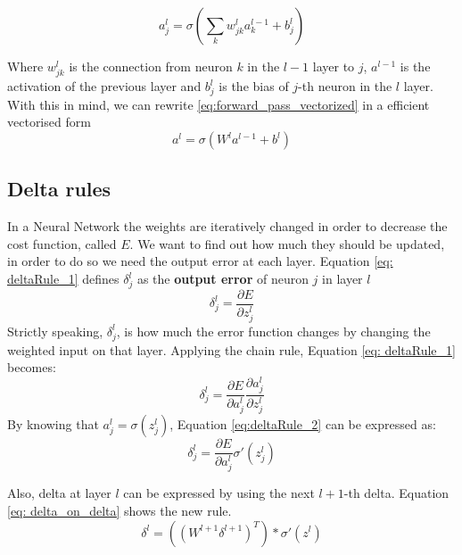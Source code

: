 \documentclass[11pt]{article}
\begin{document}
\begin{equation}
\label{eq:forward_pass}
a^l_j = \sigma(\sum_k w^l_{jk}a^{l-1}_k + b^l_j)
\end{equation}

Where $w^l_{jk}$ is the connection from neuron $k$ in the $l-1$ layer to $j$, $a^{l-1}$ is the activation of the previous layer and $b^l_j$ is the bias of $j$-th neuron in the $l$ layer. With this in mind, we can rewrite \ref{eq:forward_pass_vectorized} in a efficient vectorised form
\begin{equation}
a^l = \sigma(W^la^{l-1} + b^l)
\label{eq:forward_pass_vectorized}

\end{equation}

\subsection{Delta rules}
In a Neural Network the weights are iteratively changed in order to decrease the cost function, called $E$. We want to find out how much they should be updated, in order to do so we need the output error at each layer. Equation \ref{eq: deltaRule_1} defines $\delta^l_j$ as the \textbf{output error} of neuron $j$ in layer $l$
\begin{equation}
	\delta^l_j = \frac{\partial E}{\partial z^l_j}
	\label{eq: deltaRule_1}
\end{equation}
Strictly speaking, $\delta^l_j$, is how much the error function changes by changing the weighted input on that layer. Applying the chain rule, Equation \ref{eq: deltaRule_1} becomes:
\begin{equation}
\delta^l_j = \frac{\partial E}{\partial a^l_j} \frac{\partial a^l_j}{\partial z^l_j}
\label{eq:deltaRule_2}
\end{equation}
By knowing that $a^l_j = \sigma(z^l_j)$, Equation \ref{eq:deltaRule_2} can be expressed as:
\begin{equation}
\delta^l_j = \frac{\partial E}{\partial a^l_j} \sigma'(z^l_j)
\label{eq:deltaRule}	
\end{equation}

Also, delta at layer $l$ can be expressed by using the next $l+1$-th delta. Equation \ref{eq: delta_on_delta} shows the new rule.
\begin{equation}
\delta^l = ((W^{l+1}\delta^{l+1})^T) * \sigma'(z^l)
\label{eq: delta_on_delta}
\end{equation}
\end{document}
